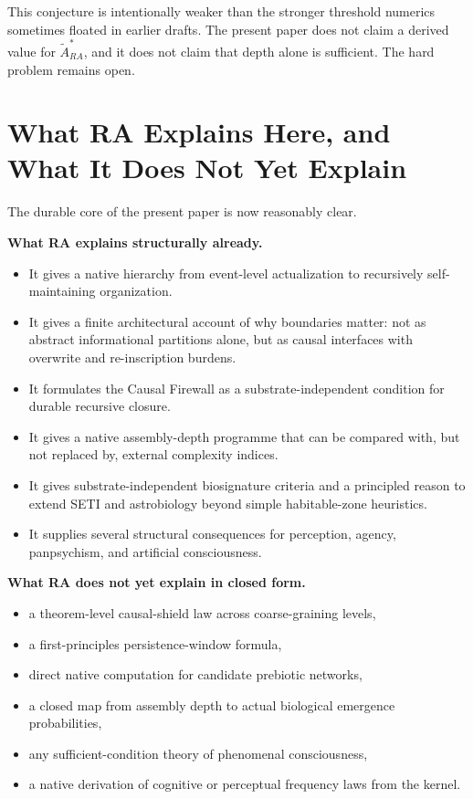 \documentclass[11pt]{article}
\def\mathrm#1{#1}%
\begin{document}
This conjecture is intentionally weaker than the stronger threshold numerics sometimes floated in earlier drafts. The present paper does not claim a derived value for $\tilde{A}_{\mathrm{RA}}^{\ast}$, and it does not claim that depth alone is sufficient. The hard problem remains open.

\section{What RA Explains Here, and What It Does Not Yet Explain}

The durable core of the present paper is now reasonably clear.

\textbf{What RA explains structurally already.}
\begin{itemize}[nosep]
    \item It gives a native hierarchy from event-level actualization to recursively self-maintaining organization.
    \item It gives a finite architectural account of why boundaries matter: not as abstract informational partitions alone, but as causal interfaces with overwrite and re-inscription burdens.
    \item It formulates the Causal Firewall as a substrate-independent condition for durable recursive closure.
    \item It gives a native assembly-depth programme that can be compared with, but not replaced by, external complexity indices.
    \item It gives substrate-independent biosignature criteria and a principled reason to extend SETI and astrobiology beyond simple habitable-zone heuristics.
    \item It supplies several structural consequences for perception, agency, panpsychism, and artificial consciousness.
\end{itemize}

\textbf{What RA does not yet explain in closed form.}
\begin{itemize}[nosep]
    \item a theorem-level causal-shield law across coarse-graining levels,
    \item a first-principles persistence-window formula,
    \item direct native computation for candidate prebiotic networks,
    \item a closed map from assembly depth to actual biological emergence probabilities,
    \item any sufficient-condition theory of phenomenal consciousness,
    \item a native derivation of cognitive or perceptual frequency laws from the kernel.
\end{itemize}
\end{document}
